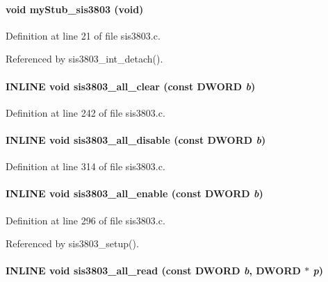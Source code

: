 \paragraph[{myStub\_\-sis3803}]{\setlength{\rightskip}{0pt plus 5cm}void myStub\_\-sis3803 (void)}\hfill\label{sis3803_8h_aa442b3e522be9529eb727abb02c3ced4}


Definition at line 21 of file sis3803.c.

Referenced by sis3803\_\-int\_\-detach().
\paragraph[{sis3803\_\-all\_\-clear}]{\setlength{\rightskip}{0pt plus 5cm}INLINE void sis3803\_\-all\_\-clear (const {\bf DWORD} {\em b})}\hfill\label{sis3803_8h_a849cfe5a432a0993a5e1973840da5125}


Definition at line 242 of file sis3803.c.
\paragraph[{sis3803\_\-all\_\-disable}]{\setlength{\rightskip}{0pt plus 5cm}INLINE void sis3803\_\-all\_\-disable (const {\bf DWORD} {\em b})}\hfill\label{sis3803_8h_a8cf3f1839a349fc5cd35ab6beb94f281}


Definition at line 314 of file sis3803.c.
\paragraph[{sis3803\_\-all\_\-enable}]{\setlength{\rightskip}{0pt plus 5cm}INLINE void sis3803\_\-all\_\-enable (const {\bf DWORD} {\em b})}\hfill\label{sis3803_8h_a1d2f489a193b74d8a6023e2343ec185c}


Definition at line 296 of file sis3803.c.

Referenced by sis3803\_\-setup().
\paragraph[{sis3803\_\-all\_\-read}]{\setlength{\rightskip}{0pt plus 5cm}INLINE void sis3803\_\-all\_\-read (const {\bf DWORD} {\em b}, \/  {\bf DWORD} $\ast$ {\em p})}\hfill\label{sis3803_8h_a0ef65dc1a9bd67cb80243a4524307008}


